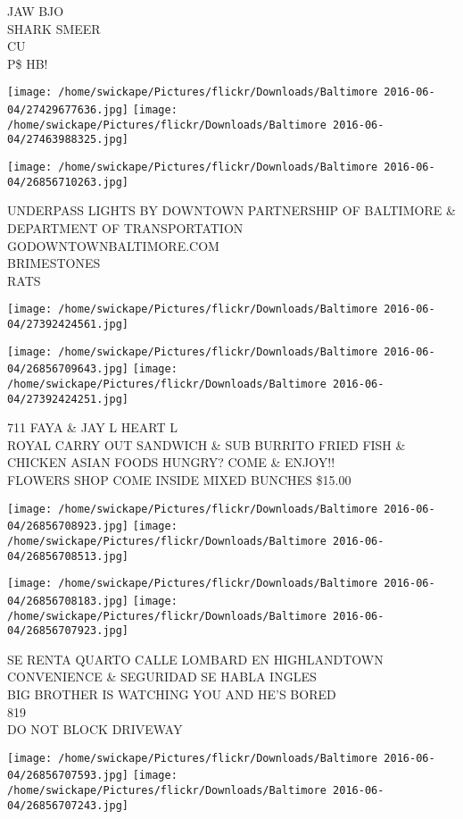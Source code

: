 \documentclass[10pt,letterpaper]{article}
\begin{document}
JAW BJO\\
SHARK SMEER\\
CU\\
P\$ HB!
\pagebreak

\texttt{[image: /home/swickape/Pictures/flickr/Downloads/Baltimore 2016-06-04/27429677636.jpg]}
\texttt{[image: /home/swickape/Pictures/flickr/Downloads/Baltimore 2016-06-04/27463988325.jpg]}

\texttt{[image: /home/swickape/Pictures/flickr/Downloads/Baltimore 2016-06-04/26856710263.jpg]}

UNDERPASS LIGHTS BY DOWNTOWN PARTNERSHIP OF BALTIMORE \& DEPARTMENT OF TRANSPORTATION GODOWNTOWNBALTIMORE.COM\\
BRIMESTONES\\
RATS
\pagebreak

\texttt{[image: /home/swickape/Pictures/flickr/Downloads/Baltimore 2016-06-04/27392424561.jpg]}

\vspace{0.25in}
\texttt{[image: /home/swickape/Pictures/flickr/Downloads/Baltimore 2016-06-04/26856709643.jpg]}
\texttt{[image: /home/swickape/Pictures/flickr/Downloads/Baltimore 2016-06-04/27392424251.jpg]}

711 FAYA \& JAY L HEART L\\
ROYAL CARRY OUT SANDWICH \& SUB BURRITO FRIED FISH \& CHICKEN ASIAN FOODS HUNGRY?  COME \& ENJOY!!\\
FLOWERS SHOP COME INSIDE MIXED BUNCHES \$15.00
\pagebreak

\texttt{[image: /home/swickape/Pictures/flickr/Downloads/Baltimore 2016-06-04/26856708923.jpg]}
\texttt{[image: /home/swickape/Pictures/flickr/Downloads/Baltimore 2016-06-04/26856708513.jpg]}

\texttt{[image: /home/swickape/Pictures/flickr/Downloads/Baltimore 2016-06-04/26856708183.jpg]}
\texttt{[image: /home/swickape/Pictures/flickr/Downloads/Baltimore 2016-06-04/26856707923.jpg]}

SE RENTA QUARTO CALLE LOMBARD EN HIGHLANDTOWN CONVENIENCE \& SEGURIDAD SE HABLA INGLES\\
BIG BROTHER IS WATCHING YOU AND HE'S BORED\\
819\\
DO NOT BLOCK DRIVEWAY
\pagebreak

\texttt{[image: /home/swickape/Pictures/flickr/Downloads/Baltimore 2016-06-04/26856707593.jpg]}
\texttt{[image: /home/swickape/Pictures/flickr/Downloads/Baltimore 2016-06-04/26856707243.jpg]}
\end{document}
